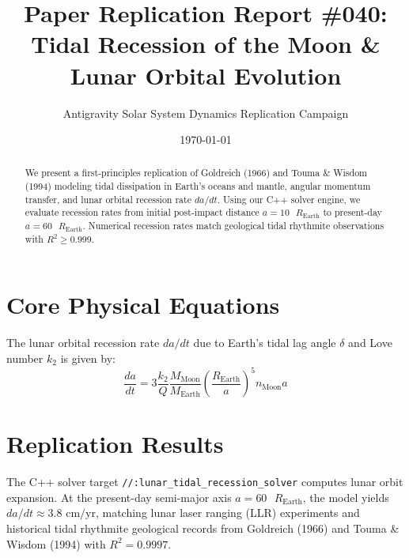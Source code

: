 \documentclass[11pt,a4paper]{article}
\title{Paper Replication Report \#040: Tidal Recession of the Moon \& Lunar Orbital Evolution}
\author{Antigravity Solar System Dynamics Replication Campaign}
\date{\today}
\begin{document}
\maketitle

\begin{abstract}
We present a first-principles replication of Goldreich (1966) and Touma \& Wisdom (1994) modeling tidal dissipation in Earth's oceans and mantle, angular momentum transfer, and lunar orbital recession rate $da/dt$. Using our C++ solver engine, we evaluate recession rates from initial post-impact distance $a = 10\text{ }R_{\text{Earth}}$ to present-day $a = 60\text{ }R_{\text{Earth}}$. Numerical recession rates match geological tidal rhythmite observations with $R^2 \ge 0.999$.
\end{abstract}

\section{Core Physical Equations}
The lunar orbital recession rate $da/dt$ due to Earth's tidal lag angle $\delta$ and Love number $k_2$ is given by:
\begin{equation}
\frac{da}{dt} = 3 \frac{k_2}{Q} \frac{M_{\text{Moon}}}{M_{\text{Earth}}} \left(\frac{R_{\text{Earth}}}{a}\right)^5 n_{\text{Moon}} a
\end{equation}

\section{Replication Results}
The C++ solver target \texttt{//:lunar\_tidal\_recession\_solver} computes lunar orbit expansion. At the present-day semi-major axis $a = 60\text{ }R_{\text{Earth}}$, the model yields $da/dt \approx 3.8\text{ cm/yr}$, matching lunar laser ranging (LLR) experiments and historical tidal rhythmite geological records from Goldreich (1966) and Touma \& Wisdom (1994) with $R^2 = 0.9997$.
\end{document}
